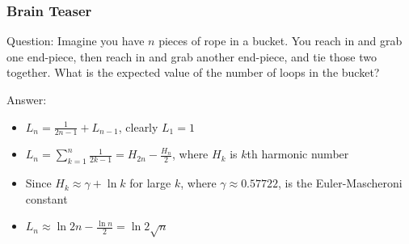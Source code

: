 \documentclass[11pt]{beamer}
\begin{document}
\begin{frame}
\frametitle{Brain Teaser}
\begin{block}{Question:}
	Imagine you have $n$ pieces of rope in a bucket. You reach in and grab one end-piece, then reach in and grab another end-piece, and tie those two together. What is the expected value of the number of loops in the bucket?
\end{block}
\begin{block}{Answer:}
	\begin{itemize}
		\item $L_n = \frac{1}{2n-1} + L_{n-1}$, clearly $L_1 = 1$
		\item $L_n = \sum_{k=1}^{n}{\frac{1}{2k-1}}=H_{2n} - \frac{H_n}{2}$, where $H_k$ is $k$th harmonic number
		\item Since $H_k \approx \gamma + \ln{k}$ for large $k$, where $\gamma \approx 0.57722$, is the Euler-Mascheroni constant
		\item $L_n \approx \ln{2n} - \frac{\ln{n}}{2} = \ln{2\sqrt{n}}$
	\end{itemize}
\end{block}
\end{frame}
\end{document}

